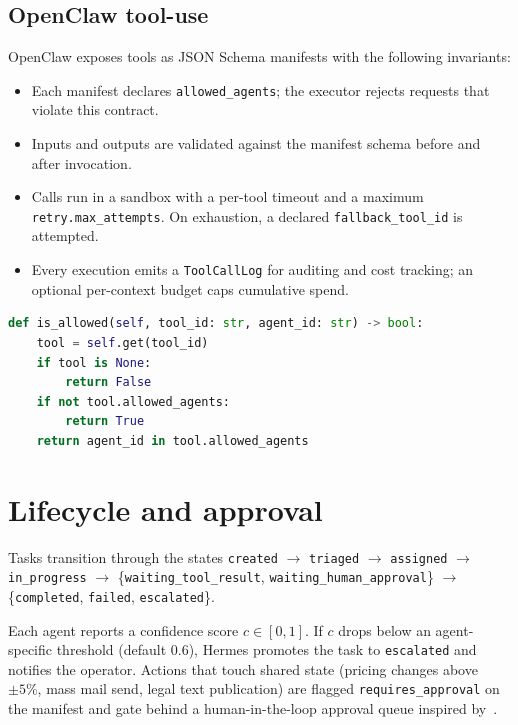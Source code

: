 \documentclass[11pt,a4paper]{article}
\begin{document}
\subsection{OpenClaw tool-use}
\label{sec:openclaw}

OpenClaw exposes tools as JSON Schema manifests with the following invariants:
\begin{itemize}
  \item Each manifest declares \texttt{allowed\_agents}; the executor rejects
    requests that violate this contract.
  \item Inputs and outputs are validated against the manifest schema before and
    after invocation.
  \item Calls run in a sandbox with a per-tool timeout and a maximum
    \texttt{retry.max\_attempts}. On exhaustion, a declared
    \texttt{fallback\_tool\_id} is attempted.
  \item Every execution emits a \texttt{ToolCallLog} for auditing and cost
    tracking; an optional per-context budget caps cumulative spend.
\end{itemize}

\begin{lstlisting}[language=Python, caption={OpenClaw permission check (excerpt).}]
def is_allowed(self, tool_id: str, agent_id: str) -> bool:
    tool = self.get(tool_id)
    if tool is None:
        return False
    if not tool.allowed_agents:
        return True
    return agent_id in tool.allowed_agents
\end{lstlisting}

\section{Lifecycle and approval}
\label{sec:lifecycle}

Tasks transition through the states
\texttt{created} $\rightarrow$ \texttt{triaged} $\rightarrow$ \texttt{assigned}
$\rightarrow$ \texttt{in\_progress} $\rightarrow$ \{\texttt{waiting\_tool\_result},
\texttt{waiting\_human\_approval}\} $\rightarrow$ \{\texttt{completed},
\texttt{failed}, \texttt{escalated}\}.

Each agent reports a confidence score $c \in [0,1]$. If $c$ drops below an
agent-specific threshold (default $0.6$), Hermes promotes the task to
\texttt{escalated} and notifies the operator. Actions that touch shared state
(pricing changes above $\pm 5\%$, mass mail send, legal text publication) are
flagged \texttt{requires\_approval} on the manifest and gate behind a
human-in-the-loop approval queue inspired by~\cite{ouyang2022rlhf}.
\end{document}
